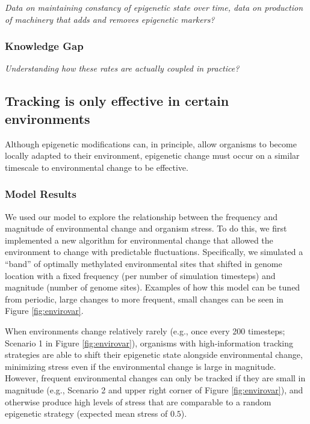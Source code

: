\documentclass{article}
\begin{document}
\textit{Data on maintaining constancy of epigenetic state over time, data on production of machinery that adds and removes epigenetic markers?}

\subsubsection{Knowledge Gap}

\textit{Understanding how these rates are actually coupled in practice?}




\clearpage

\subsection{Tracking is only effective in certain environments}

Although epigenetic modifications can, in principle, allow organisms to become locally adapted to their environment, epigenetic change must occur on a similar timescale to environmental change to be effective.


\subsubsection{Model Results}

We used our model to explore the relationship between the frequency and magnitude of environmental change and organism stress. To do this, we first implemented a new algorithm for environmental change that allowed the environment to change with predictable fluctuations. Specifically, we simulated a ``band'' of optimally methylated environmental sites that shifted in genome location with a fixed frequency (per number of simulation timesteps) and magnitude (number of genome sites). Examples of how this model can be tuned from periodic, large changes to more frequent, small changes can be seen in Figure \ref{fig:envirovar}.

When environments change relatively rarely (e.g., once every 200 timesteps; Scenario 1 in Figure \ref{fig:envirovar}), organisms with high-information tracking strategies are able to shift their epigenetic state alongside environmental change, minimizing stress even if the environmental change is large in magnitude. However, frequent environmental changes can only be tracked if they are small in magnitude (e.g., Scenario 2 and upper right corner of Figure \ref{fig:envirovar}), and otherwise produce high levels of stress that are comparable to a random epigenetic strategy (expected mean stress of $0.5$).
\end{document}
